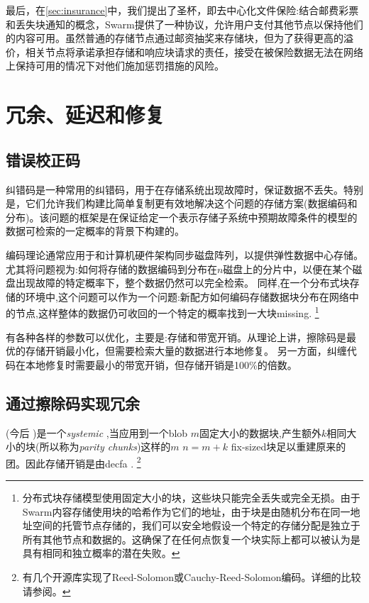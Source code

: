 最后，在\ref{sec:insurance}中，我们提出了圣杯，即去中心化文件保险:结合邮费彩票和丢失块通知的概念，Swarm提供了一种协议，允许用户支付其他节点以保持他们的内容可用。虽然普通的存储节点通过邮资抽奖来存储块，但为了获得更高的溢价，相关节点将承诺承担存储和响应块请求的责任，接受在被保险数据无法在网络上保持可用的情况下对他们施加惩罚措施的风险。


\section{冗余、延迟和修复\statusgreen}\label{sec:repair}

\green{}

\subsection{错误校正码}\label{sec:error-correcting-codes}

纠错码是一种常用的纠错码，用于在存储系统出现故障时，保证数据不丢失。特别是，它们允许我们构建比简单复制更有效地解决这个问题的存储方案(数据编码和分布)。该问题的框架是在保证给定一个表示存储子系统中预期故障条件的模型的数据可检索的一定概率的背景下构建的。

编码理论通常应用于和计算机硬件架构同步磁盘阵列，以提供弹性数据中心存储。
尤其将问题视为:如何将存储的数据编码到分布在$n$磁盘上的分片中，以便在某个磁盘出现故障的特定概率下，整个数据仍然可以完全检索。
同样,在一个分布式块存储的环境中,这个问题可以作为一个问题:新配方如何编码存储数据块分布在网络中的节点,这样整体的数据仍可收回的一个特定的概率找到一大块missing. %
%
\footnote{分布式块存储模型使用固定大小的块，这些块只能完全丢失或完全无损。由于Swarm内容存储使用块的哈希作为它们的地址，由于块是由随机分布在同一地址空间的托管节点存储的，我们可以安全地假设一个特定的存储分配是独立于所有其他节点和数据的。这确保了在任何点恢复一个块实际上都可以被认为是具有相同和独立概率的潜在失败。}

有各种各样的参数可以优化，主要是:存储和带宽开销。从理论上讲，擦除码是最优的存储开销最小化，但需要检索大量的数据进行本地修复。
另一方面，纠缠代码在本地修复时需要最小的带宽开销，但存储开销是100\%的倍数。 

\subsection{通过擦除码实现冗余\statusgreen}\label{sec:erasure}


(今后 \cite{lubyetal1995CRS} \cite{plank2006optimizing})是一个\emph{systemic} ,当应用到一个blob $m$固定大小的数据块,产生额外$k$相同大小的块(所以称为\emph{parity chunks})这样的$m$ $n=m+k$ fix-sized块足以重建原来的团。因此存储开销是由decfa .%
%
\footnote{%
有几个开源库实现了Reed-Solomon或Cauchy-Reed-Solomon编码。详细的比较请参阅\cite{plank2009performance}。}

